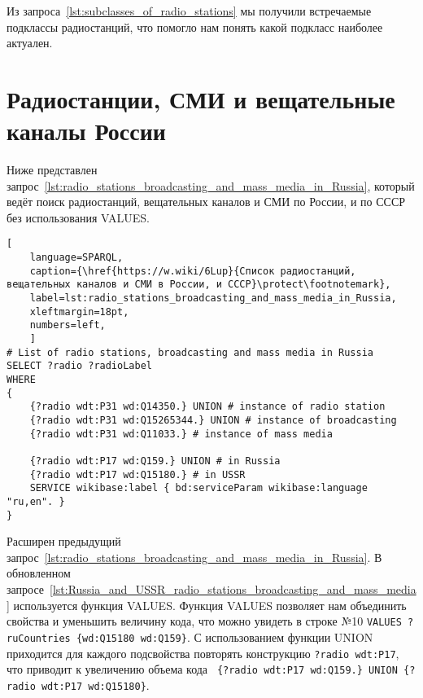 
Из запроса~\ref{lst:subclasses_of_radio_stations} мы получили встречаемые подклассы радиостанций, что помогло нам понять какой подкласс наиболее актуален. 

\newpage

\section{Радиостанции, СМИ и вещательные каналы России}

Ниже представлен запрос~\ref{lst:radio_stations_broadcasting_and_mass_media_in_Russia}, который ведёт поиск радиостанций, вещательных каналов и СМИ по России, и по СССР без использования VALUES.

\begin{lstlisting}[ 
    language=SPARQL,
    caption={\href{https://w.wiki/6Lup}{Список радиостанций, вещательных каналов и СМИ в России, и СССР}\protect\footnotemark},
    label=lst:radio_stations_broadcasting_and_mass_media_in_Russia,
    xleftmargin=18pt,
    numbers=left,
    ]
# List of radio stations, broadcasting and mass media in Russia 
SELECT ?radio ?radioLabel
WHERE
{
    {?radio wdt:P31 wd:Q14350.} UNION # instance of radio station
    {?radio wdt:P31 wd:Q15265344.} UNION # instance of broadcasting
    {?radio wdt:P31 wd:Q11033.} # instance of mass media
    
    {?radio wdt:P17 wd:Q159.} UNION # in Russia
    {?radio wdt:P17 wd:Q15180.} # in USSR
    SERVICE wikibase:label { bd:serviceParam wikibase:language "ru,en". }
}\end{lstlisting}%


\newpage

Расширен предыдущий запрос~\ref{lst:radio_stations_broadcasting_and_mass_media_in_Russia}. В обновленном запросе~\ref{lst:Russia_and_USSR_radio_stations_broadcasting_and_mass_media} используется функция VALUES.  Функция VALUES позволяет нам объединить свойства и уменьшить величину кода, что можно увидеть в строке №10 \lstinline|VALUES ?ruCountries {wd:Q15180 wd:Q159}|. С использованием функции UNION приходится для каждого подсвойства повторять конструкцию \lstinline|?radio wdt:P17|, что приводит к увеличению объема кода \lstinline| {?radio wdt:P17 wd:Q159.} UNION {?radio wdt:P17 wd:Q15180}|.

